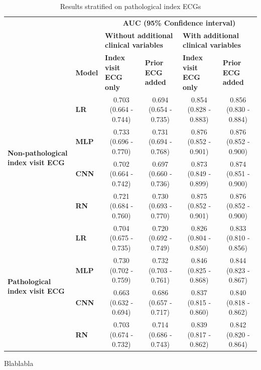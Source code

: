 \documentclass[preprint]{elsarticle}
\begin{document}
\renewcommand{\arraystretch}{1.2}
\begin{table}[H]
  \centering
  \scriptsize
\begin{adjustbox}{center}
\begin{tabular}{@{}llcccc@{}}
  \toprule
  & & \multicolumn{4}{c}{\textbf{AUC (95\% Confidence interval)}} \\
  \cmidrule(lr){3-6}
  & & \multicolumn{2}{l}{\textbf{Without additional clinical variables}} & \multicolumn{2}{l}{\textbf{With additional clinical variables}} \\
  \cmidrule(lr){3-4}\cmidrule(lr){5-6}
  & \multicolumn{1}{l}{\textbf{Model}} & \multicolumn{1}{l}{\textbf{Index visit ECG only}} & \multicolumn{1}{l}{\textbf{Prior ECG added}} & \multicolumn{1}{l}{\textbf{Index visit ECG only}} & \multicolumn{1}{l}{\textbf{Prior ECG added}} \\
  \midrule

\multirow{4}{*}{\begin{minipage}{0.65in}\textbf{Non-pathological index visit ECG}\end{minipage}} %
& \textbf{LR}  & 0.703 (0.664 - 0.744) & 0.694 (0.654 - 0.735) & 0.854 (0.828 - 0.883) & 0.856 (0.830 - 0.884) \\
& \textbf{MLP} & 0.733 (0.696 - 0.770) & 0.731 (0.694 - 0.768) & 0.876 (0.852 - 0.901) & 0.876 (0.852 - 0.900) \\
& \textbf{CNN} & 0.702 (0.664 - 0.742) & 0.697 (0.660 - 0.736) & 0.873 (0.849 - 0.899) & 0.874 (0.851 - 0.900) \\
& \textbf{RN}  & 0.721 (0.684 - 0.760) & 0.730 (0.693 - 0.770) & 0.875 (0.852 - 0.901) & 0.876 (0.852 - 0.900) \\
  \cmidrule(lr){1-2}
\multirow{4}{*}{\begin{minipage}{0.65in}\textbf{Pathological index visit ECG}\end{minipage}} %
& \textbf{LR}  & 0.704 (0.675 - 0.735) & 0.720 (0.692 - 0.749) & 0.826 (0.804 - 0.850) & 0.833 (0.810 - 0.856) \\
& \textbf{MLP} & 0.730 (0.702 - 0.759) & 0.732 (0.703 - 0.761) & 0.846 (0.825 - 0.868) & 0.844 (0.823 - 0.867) \\
& \textbf{CNN} & 0.663 (0.632 - 0.694) & 0.686 (0.657 - 0.717) & 0.837 (0.815 - 0.860) & 0.840 (0.818 - 0.862) \\
& \textbf{RN}  & 0.703 (0.674 - 0.732) & 0.714 (0.686 - 0.743) & 0.839 (0.817 - 0.862) & 0.842 (0.820 - 0.864) \\

\bottomrule
\end{tabular}
\end{adjustbox}
\caption{Results stratified on pathological index ECGs}
\medskip
\small
Blablabla
\label{table:appendix:pathological}
\end{table}
\renewcommand{\arraystretch}{1}
\end{document}
